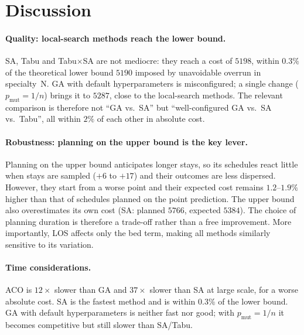 \documentclass[11pt,a4paper]{article}
\begin{document}
\clearpage
\section{Discussion}

\paragraph{Quality: local-search methods reach the lower bound.}
SA, Tabu and Tabu\(\times\)SA are not mediocre: they reach a cost of \(5198\), within \(0.3\%\) of the theoretical lower bound \(5190\) imposed by unavoidable overrun in specialty~N. GA with default hyperparameters is misconfigured; a single change (\(p_{\mathrm{mut}}=1/n\)) brings it to \(5287\), close to the local-search methods. The relevant comparison is therefore not ``GA vs.\ SA'' but ``well-configured GA vs.\ SA vs.\ Tabu'', all within \(2\%\) of each other in absolute cost.

\paragraph{Robustness: planning on the upper bound is the key lever.}
Planning on the upper bound anticipates longer stays, so its schedules react little when stays are sampled (\(+6\) to \(+17\)) and their outcomes are less dispersed. However, they start from a worse point and their expected cost remains \(1.2\)--\(1.9\%\) higher than that of schedules planned on the point prediction. The upper bound also overestimates its own cost (SA: planned \(5766\), expected \(5384\)). The choice of planning duration is therefore a trade-off rather than a free improvement. More importantly, LOS affects only the bed term, making all methods similarly sensitive to its variation.

\paragraph{Time considerations.}
ACO is \(12\times\) slower than GA and \(37\times\) slower than SA at large scale, for a worse absolute cost. SA is the fastest method and is within \(0.3\%\) of the lower bound. GA with default hyperparameters is neither fast nor good; with \(p_{\mathrm{mut}}=1/n\) it becomes competitive but still slower than SA/Tabu.
\end{document}
